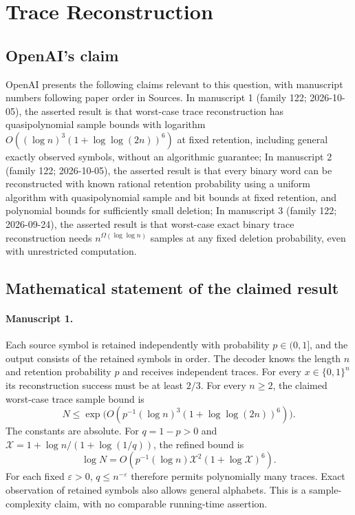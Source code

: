 \documentclass[11pt]{article}
\begin{document}
\section*{Trace Reconstruction}

\subsection{OpenAI's claim}
OpenAI presents the following claims relevant to this question, with manuscript numbers following paper order in Sources. In manuscript 1 (family 122; 2026-10-05), the asserted result is that worst-case trace reconstruction has quasipolynomial sample bounds with logarithm $O((\log n)^3(1+\log\log(2n))^6)$ at fixed retention, including general exactly observed symbols, without an algorithmic guarantee; In manuscript 2 (family 122; 2026-10-05), the asserted result is that every binary word can be reconstructed with known rational retention probability using a uniform algorithm with quasipolynomial sample and bit bounds at fixed retention, and polynomial bounds for sufficiently small deletion; In manuscript 3 (family 122; 2026-09-24), the asserted result is that worst-case exact binary trace reconstruction needs $n^{\Omega(\log\log n)}$ samples at any fixed deletion probability, even with unrestricted computation.

\subsection{Mathematical statement of the claimed result}
\paragraph{Manuscript 1.}
Each source symbol is retained independently with probability $p\in(0,1]$, and the output consists of the retained symbols in order. The decoder knows the length $n$ and retention probability $p$ and receives independent traces. For every $x\in\{0,1\}^n$ its reconstruction success must be at least $2/3$. For every $n\ge2$, the claimed worst-case trace sample bound is
\[
 N\le\exp\bigl(O(p^{-1}(\log n)^3(1+\log\log(2n))^6)\bigr).
\]
The constants are absolute. For $q=1-p>0$ and $\mathcal X=1+\log n/(1+\log(1/q))$, the refined bound is
\[
 \log N=O(p^{-1}(\log n)\mathcal X^2(1+\log\mathcal X)^6).
\]
For each fixed $\varepsilon>0$, $q\le n^{-\varepsilon}$ therefore permits polynomially many traces. Exact observation of retained symbols also allows general alphabets. This is a sample-complexity claim, with no comparable running-time assertion.
\end{document}
